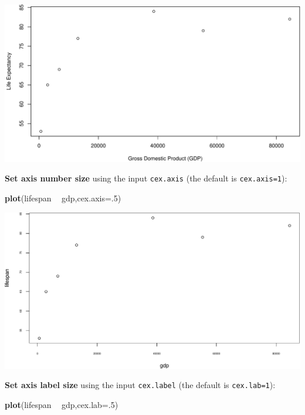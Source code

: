 \documentclass[
]{book}
\newenvironment{Shaded}{\begin{snugshade}}{\end{snugshade}}
\newcommand{\DataTypeTok}[1]{\textcolor[rgb]{0.13,0.29,0.53}{#1}}
\newcommand{\DecValTok}[1]{\textcolor[rgb]{0.00,0.00,0.81}{#1}}
\newcommand{\KeywordTok}[1]{\textcolor[rgb]{0.13,0.29,0.53}{\textbf{#1}}}
\newcommand{\NormalTok}[1]{#1}
\newcommand{\OperatorTok}[1]{\textcolor[rgb]{0.81,0.36,0.00}{\textbf{#1}}}
\newcommand{\StringTok}[1]{\textcolor[rgb]{0.31,0.60,0.02}{#1}}
\begin{document}
\includegraphics{figures/unnamed-chunk-106-1.pdf}

\textbf{Set axis number size} using the input \texttt{cex.axis} (the default is \texttt{cex.axis=1}):

\begin{Shaded}
\begin{Highlighting}[]
\KeywordTok{plot}\NormalTok{(lifespan }\OperatorTok{~}\StringTok{ }\NormalTok{gdp,}\DataTypeTok{cex.axis=}\NormalTok{.}\DecValTok{5}\NormalTok{)}
\end{Highlighting}
\end{Shaded}

\includegraphics{figures/unnamed-chunk-107-1.pdf}

\textbf{Set axis label size} using the input \texttt{cex.label} (the default is \texttt{cex.lab=1}):

\begin{Shaded}
\begin{Highlighting}[]
\KeywordTok{plot}\NormalTok{(lifespan }\OperatorTok{~}\StringTok{ }\NormalTok{gdp,}\DataTypeTok{cex.lab=}\NormalTok{.}\DecValTok{5}\NormalTok{)}
\end{Highlighting}
\end{Shaded}
\end{document}
